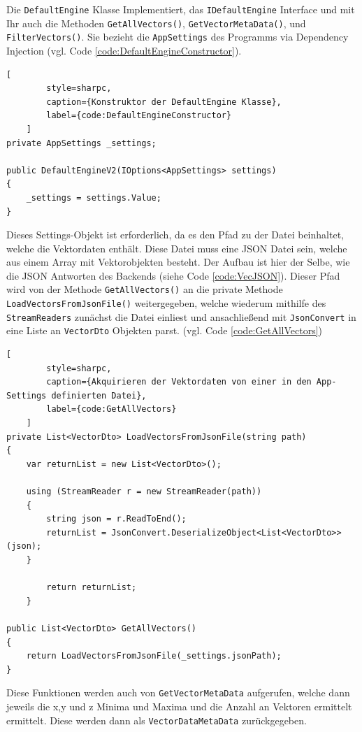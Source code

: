 Die \texttt{DefaultEngine} Klasse Implementiert, das \texttt{IDefaultEngine} Interface
und mit Ihr auch die Methoden \texttt{GetAllVectors()}, \texttt{GetVectorMetaData()},
und \texttt{FilterVectors()}. Sie bezieht die \texttt{AppSettings} des Programms via
Dependency Injection (vgl. Code \ref{code:DefaultEngineConstructor}).

\begin{codeblock}
	\begin{lstlisting}[
		style=sharpc,
		caption={Konstruktor der DefaultEngine Klasse},
		label={code:DefaultEngineConstructor}
	]
private AppSettings _settings;

public DefaultEngineV2(IOptions<AppSettings> settings)
{
	_settings = settings.Value;
}
	\end{lstlisting}
\end{codeblock}

Dieses Settings-Objekt ist erforderlich, da es den Pfad zu der Datei
beinhaltet, welche die Vektordaten enthält. Diese Datei muss eine JSON
Datei sein, welche aus einem Array mit Vektorobjekten besteht.
Der Aufbau ist hier der Selbe, wie die JSON Antworten des Backends
(siehe Code \ref{code:VecJSON}). Dieser Pfad wird von der Methode
\texttt{GetAllVectors()} an die private Methode
\texttt{LoadVectorsFromJsonFile()} weitergegeben, welche wiederum
mithilfe des \texttt{StreamReaders} zunächst die Datei einliest
und ansachließend mit \texttt{JsonConvert} in eine Liste an
\texttt{VectorDto} Objekten parst. (vgl. Code \ref{code:GetAllVectors})

\begin{codeblock}
	\begin{lstlisting}[
		style=sharpc,
		caption={Akquirieren der Vektordaten von einer in den App-Settings definierten Datei},
		label={code:GetAllVectors}
	]
private List<VectorDto> LoadVectorsFromJsonFile(string path)
{
	var returnList = new List<VectorDto>();

	using (StreamReader r = new StreamReader(path))
	{
		string json = r.ReadToEnd();
		returnList = JsonConvert.DeserializeObject<List<VectorDto>>(json);
	}

		return returnList;
	}

public List<VectorDto> GetAllVectors()
{
	return LoadVectorsFromJsonFile(_settings.jsonPath);
}
	\end{lstlisting}
\end{codeblock}

Diese Funktionen werden auch von \texttt{GetVectorMetaData}
aufgerufen, welche dann jeweils die x,y und z Minima und Maxima und
die Anzahl an Vektoren ermittelt ermittelt. Diese werden dann als
\texttt{VectorDataMetaData} zurückgegeben.

